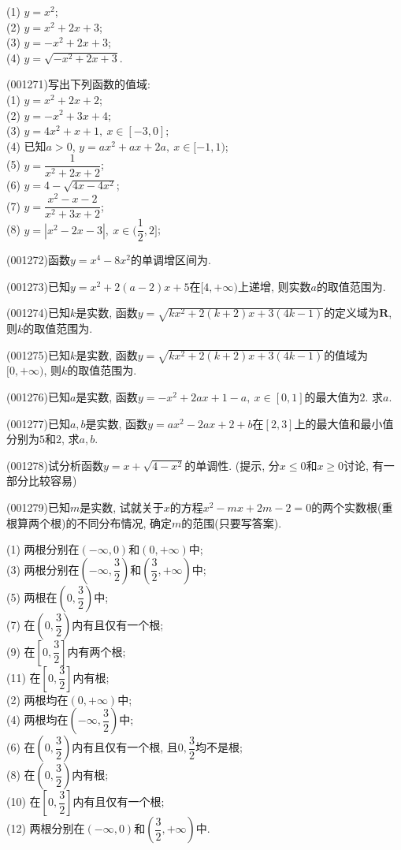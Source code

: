 (1) $y=x^2$; \\ 
(2) $y=x^2+2x+3$; \\ 
(3) $y=-x^2+2x+3$; \\ 
(4) $y=\sqrt{-x^2+2x+3}$. 
\item (001271)写出下列函数的值域:\\ 
(1) $y=x^2+2x+2$; \\ 
(2) $y=-x^2+3x+4$; \\ 
(3) $y=4x^2+x+1, \ x \in [-3,0]$; \\ 
(4) 已知$a>0$, $y=ax^2+ax+2a, \ x \in [-1,1)$; \\ 
(5) $y=\dfrac{1}{x^2+2x+2}$; \\ 
(6) $y=4-\sqrt{4x-4x^2}$; \\ 
(7) $y=\dfrac{x^2-x-2}{x^2+3x+2}$; \\ 
(8) $y=|x^2-2x-3|, \ x \in (\dfrac{1}{2},2]$; 
\item (001272)函数$y=x^4-8x^2$的单调增区间为.
\item (001273)已知$y=x^2+2(a-2)x+5$在$[4,+\infty)$上递增, 则实数$a$的取值范围为.
\item (001274)已知$k$是实数, 函数$y=\sqrt{kx^2+2(k+2)x+3(4k-1)}$的定义域为$\mathbf{R}$, 则$k$的取值范围为.
\item (001275)已知$k$是实数, 函数$y=\sqrt{kx^2+2(k+2)x+3(4k-1)}$的值域为$[0,+\infty)$, 则$k$的取值范围为.
\item (001276)已知$a$是实数, 函数$y=-x^2+2ax+1-a, \ x \in [0,1]$的最大值为$2$. 求$a$.
\item (001277)已知$a,b$是实数, 函数$y=ax^2-2ax+2+b$在$[2,3]$上的最大值和最小值分别为$5$和$2$, 求$a,b$.
\item (001278)试分析函数$y=x+\sqrt{4-x^2}$的单调性. (提示, 分$x\le0$和$x \ge 0$讨论, 有一部分比较容易)
\item (001279)已知$m$是实数, 试就关于$x$的方程$x^2-mx+2m-2=0$的两个实数根(重根算两个根)的不同分布情况, 确定$m$的范围(只要写答案).
\begin{multicols}{2}
(1) 两根分别在$(-\infty,0)$和$(0,+\infty)$中;\\ 
(3) 两根分别在$(-\infty,\dfrac{3}{2})$和$(\dfrac{3}{2},+\infty)$中;\\ 
(5) 两根在$(0,\dfrac{3}{2})$中;\\ 
(7) 在$(0,\dfrac{3}{2})$内有且仅有一个根;\\ 
(9) 在$[0,\dfrac{3}{2}]$内有两个根;\\ 
(11) 在$[0,\dfrac{3}{2}]$内有根;\\ 
(2) 两根均在$(0,+\infty)$中;\\ 
(4) 两根均在$(-\infty,\dfrac{3}{2})$中;\\ 
(6) 在$(0,\dfrac{3}{2})$内有且仅有一个根, 且$0,\dfrac{3}{2}$均不是根;\\ 
(8) 在$(0,\dfrac{3}{2})$内有根;\\ 
(10) 在$[0,\dfrac{3}{2}]$内有且仅有一个根;\\ 
(12) 两根分别在$(-\infty,0)$和$(\dfrac{3}{2},+\infty)$中.\\ 
\end{multicols}
